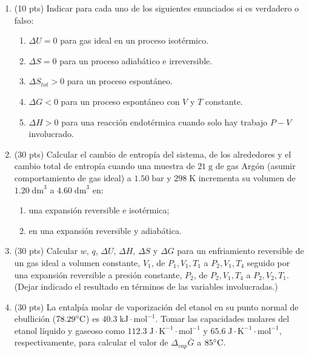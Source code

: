 \documentclass[a4paper,12pt]{article}
\begin{document}
\begin{enumerate}

 \item (10 pts) Indicar para cada uno de los siguientes enunciados si es verdadero o falso:
 \begin{enumerate}
  \item $\Delta U=0$ para gas ideal en un proceso isot\'ermico.
  \item $\Delta S=0$ para un proceso adiab\'atico e irreversible.
  \item $\Delta S_{tot}>0$ para un proceso espont\'aneo.
  \item $\Delta G<0$ para un proceso espont\'aneo con $V$ y $T$ constante.
  \item $\Delta H>0$ para una reacci\'on endot\'ermica cuando solo hay trabajo $P-V$ involucrado.
 \end{enumerate}

 \item (30 pts) Calcular el cambio de entrop\'ia del sistema, de los alrededores y el cambio total de entrop\'ia cuando una muestra de $21\;\mbox{g}$ de gas Arg\'on (asumir comportamiento de gas ideal) a $1.50\;\mbox{bar}$ y $298\;\mbox{K}$ incrementa su volumen de $1.20\;\mbox{dm}^3$ a $4.60\;\mbox{dm}^3$ en:
 \begin{enumerate}
  \item una expansi\'on reversible e isot\'ermica;
  \item en una expansi\'on reversible y adiab\'atica.
 \end{enumerate}

 \item (30 pts) Calcular $w$, $q$, $\Delta U$, $\Delta H$, $\Delta S$ y $\Delta G$ para un enfriamiento reversible de un gas ideal a volumen constante, $V_1$, de $P_1, V_1, T_1$ a $P_2, V_1, T_4$ seguido por una expansi\'on reversible a presi\'on constante, $P_2$, de $P_2, V_1, T_4$ a $P_2, V_2, T_1$. (Dejar indicado el resultado en t\'erminos de las variables involucradas.)

 \item (30 pts) La entalp\'ia molar de vaporizaci\'on del etanol en su punto normal de ebullici\'on ($78.29\celsius$) es $40.3\;\mbox{kJ}\cdot\mbox{mol}^{-1}$. Tomar las capacidades molares del etanol l\'iquido y gaseoso como $112.3\;\mbox{J}\cdot\mbox{K}^{-1}\cdot\mbox{mol}^{-1}$ y $65.6\;\mbox{J}\cdot\mbox{K}^{-1}\cdot\mbox{mol}^{-1}$, respectivamente, para calcular el valor de $\Delta_{vap}\bar{G}$ a $85\celsius$.

\end{enumerate}
\end{document}
